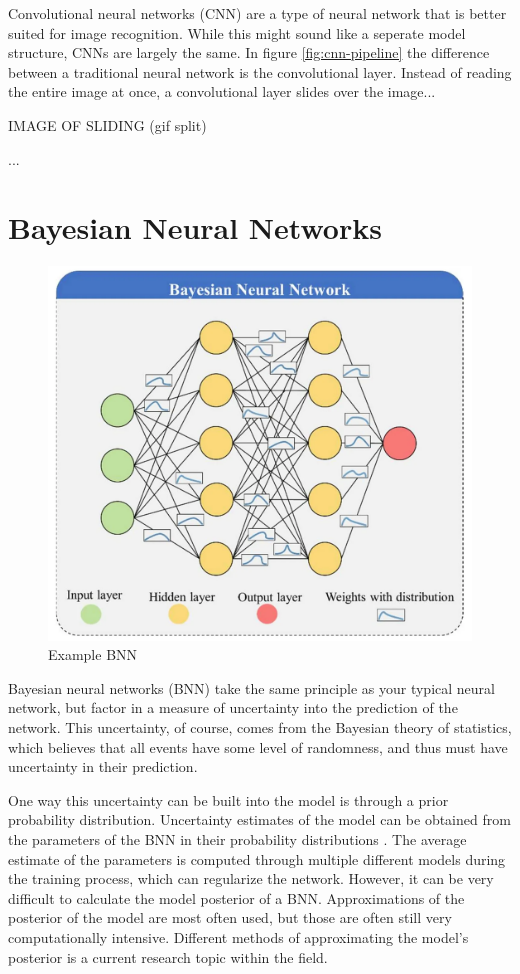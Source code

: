 \documentclass[12pt]{article}
\begin{document}
Convolutional neural networks (CNN) are a type of neural network that is better suited for image recognition. While this might sound like a seperate model structure, CNNs are largely the same. In figure \ref{fig:cnn-pipeline} the difference between a traditional neural network is the convolutional layer. Instead of reading the entire image at once, a convolutional layer slides over the image...

IMAGE OF SLIDING (gif split)

 ... 



\section{Bayesian Neural Networks}

\begin{figure}[H]
	\centering
	\includegraphics[width=.55\textwidth]{../Images/example_bnn.png}
	\caption{Example BNN  \cite{FleszarBNN}}
\end{figure}

Bayesian neural networks (BNN) take the same principle as your typical neural network, but factor in a measure of uncertainty into the prediction of the network. This uncertainty, of course, comes from the Bayesian theory of statistics, which believes that all events have some level of randomness, and thus must have uncertainty in their prediction. 

One way this uncertainty can be built into the model is through a prior probability distribution. Uncertainty estimates of the model can be obtained from the parameters of the BNN in their probability distributions \cite{shridhar2019comprehensive}. The average estimate of the parameters is computed through multiple different models during the training process, which can regularize the network. However, it can be very difficult to calculate the model posterior of a BNN. Approximations of the posterior of the model are most often used, but those are often still very computationally intensive. Different methods of approximating the model's posterior is a current research topic within the field.
\end{document}
